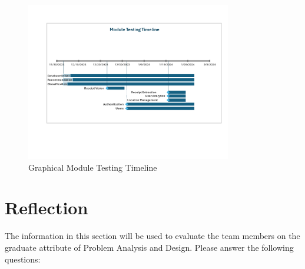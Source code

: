 \documentclass[12pt, titlepage]{article}
\begin{document}
\begin{figure}[H]
  \centering
  \caption{Graphical Module Testing Timeline}\label{FigureModuleTestingTimeline}
  \includegraphics[width=0.8\textwidth]{./res/ModuleTestTimeline.pdf}
\end{figure}

\newpage{}

\section{Reflection}

The information in this section will be used to evaluate the team members on the
graduate attribute of Problem Analysis and Design.  Please answer the following questions:
\end{document}
